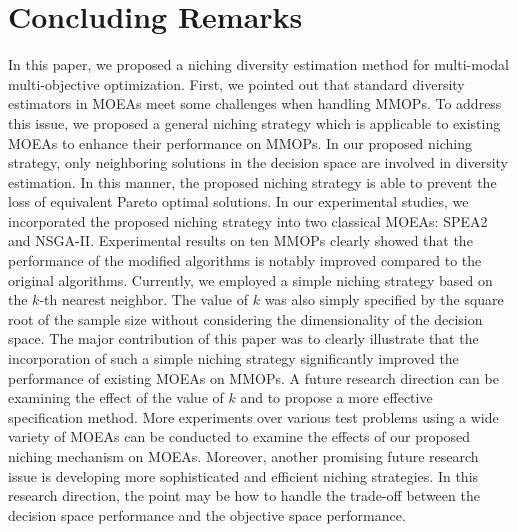 \section{Concluding Remarks}
\label{sec: Conclusion}
In this paper, we proposed a niching diversity estimation method for multi-modal multi-objective optimization. First, we pointed out that standard diversity estimators in MOEAs meet some challenges when handling MMOPs. To address this issue, we proposed a general niching strategy which is applicable to existing MOEAs to enhance their performance on MMOPs. In our proposed niching strategy, only neighboring solutions in the decision space are involved in diversity estimation. In this manner, the proposed niching strategy is able to prevent the loss of equivalent Pareto optimal solutions. In our experimental studies, we incorporated the proposed niching strategy into two classical MOEAs: SPEA2 and NSGA-II. Experimental results on ten MMOPs clearly showed that the performance of the modified algorithms is notably improved compared to the original algorithms. Currently, we employed a simple niching strategy based on the $k$-th nearest neighbor. The value of $k$ was also simply specified by the square root of the sample size without considering the dimensionality of the decision space. The major contribution of this paper was to clearly illustrate that the incorporation of such a simple niching strategy significantly improved the performance of existing MOEAs on MMOPs. A future research direction can be examining the effect of the value of $k$ and to propose a more effective specification method. 
More experiments over various test problems using a wide variety of MOEAs can be conducted to examine the 
effects of our proposed niching mechanism on MOEAs. Moreover, another promising future research issue is developing more sophisticated and efficient niching strategies. In this research direction, the point may be how to handle the trade-off between the decision space performance and the objective space performance.